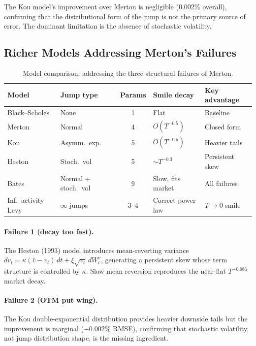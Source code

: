 \documentclass[12pt]{article}
\begin{document}
The Kou model's improvement over Merton is negligible (0.002\% overall),
confirming that the distributional form of the jump is not the primary source
of error. The dominant limitation is the absence of stochastic volatility.

\subsection*{Richer Models Addressing Merton's Failures}

\begin{table}[H]
\centering
\caption{Model comparison: addressing the three structural failures of Merton.}
\small
\begin{tabular}{p{2.8cm} p{2.0cm} c p{2.6cm} p{3.0cm}}
\toprule
\textbf{Model} & \textbf{Jump type} & \textbf{Params} &
\textbf{Smile decay} & \textbf{Key advantage} \\
\midrule
Black--Scholes      & None                 & 1    & Flat               & Baseline \\
Merton              & Normal               & 4    & $O(T^{-0.5})$      & Closed form \\
Kou                 & Asymm.\ exp.         & 5    & $O(T^{-0.5})$      & Heavier tails \\
Heston              & Stoch.\ vol          & 5    & $\sim T^{-0.3}$    & Persistent skew \\
Bates               & Normal + stoch.\ vol & 9    & Slow, fits market  & All failures \\
Inf.\ activity Levy & $\infty$ jumps       & 3--4 & Correct power law  & $T\to 0$ smile \\
\bottomrule
\end{tabular}
\label{tab:w7_models}
\end{table}

\paragraph{Failure 1 (decay too fast).}
The Heston (1993) model introduces mean-reverting variance
$dv_t = \kappa(\bar{v}-v_t)\,dt + \xi\sqrt{v_t}\,dW_t^v$,
generating a persistent skew whose term structure is controlled by $\kappa$.
Slow mean reversion reproduces the near-flat $T^{-0.086}$ market decay.

\paragraph{Failure 2 (OTM put wing).}
The Kou double-exponential distribution provides heavier downside tails but
the improvement is marginal ($-0.002\%$ RMSE), confirming that stochastic
volatility, not jump distribution shape, is the missing ingredient.
\end{document}
